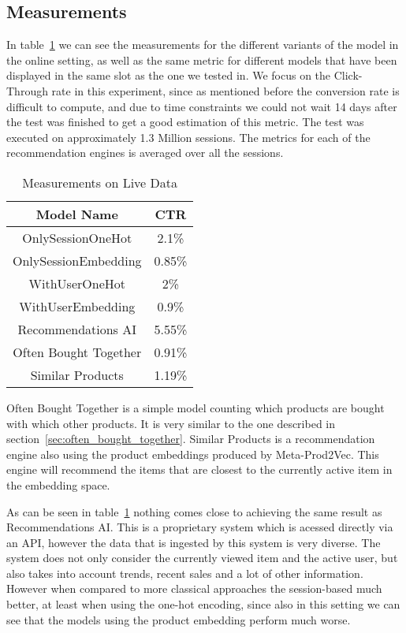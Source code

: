 \subsection{Measurements}
In table~\ref{tab:online_measurements} we can see the measurements for the different variants of the model in the online setting, as well as the same metric for different models that have been displayed in the same slot as the one we tested in.
We focus on the Click-Through rate in this experiment, since as mentioned before the conversion rate is difficult to compute, and due to time constraints we could not wait 14 days after the test was finished to get a good estimation of this metric.
The test was executed on approximately 1.3 Million sessions.
The metrics for each of the recommendation engines is averaged over all the sessions.
\begin{table}[t]
    \centering
    \begin{tabular}{|c|c|}
        \hline
        Model Name & CTR \\ \hline
        OnlySessionOneHot & 2.1\% \\ \hline
        OnlySessionEmbedding & 0.85\% \\ \hline
        WithUserOneHot & 2\% \\ \hline
        WithUserEmbedding & 0.9\% \\ \hline
        Recommendations AI & 5.55\% \\ \hline
        Often Bought Together & 0.91\% \\ \hline
        Similar Products & 1.19\% \\ \hline
    \end{tabular}
    \caption{Measurements on Live Data}
    \label{tab:online_measurements}
\end{table}
Often Bought Together is a simple model counting which products are bought with which other products.
It is very similar to the one described in section~\ref{sec:often_bought_together}.
Similar Products is a recommendation engine also using the product embeddings produced by Meta-Prod2Vec.
This engine will recommend the items that are closest to the currently active item in the embedding space.
\par
As can be seen in table~\ref{tab:online_measurements} nothing comes close to achieving the same result as Recommendations AI.
This is a proprietary system which is acessed directly via an API, however the data that is ingested by this system is very diverse.
The system does not only consider the currently viewed item and the active user, but also takes into account trends, recent sales and a lot of other information.
However when compared to more classical approaches the session-based much better, at least when using the one-hot encoding, since also in this setting we can see that the models using the product embedding perform much worse.
